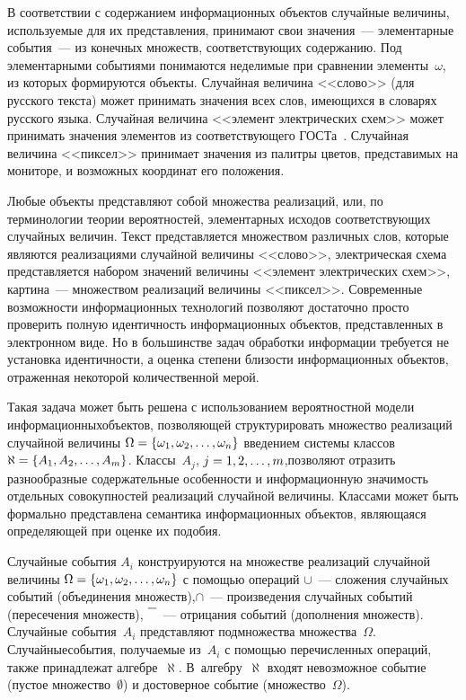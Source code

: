 \begin{multicols}{2}
  В соответствии с содержанием информационных объектов случайные
величины, используемые для их представления, принимают свои значения~---
элементарные события~--- из конечных множеств, соответствующих
содержанию. Под элементарными событиями понимаются неделимые при
сравнении элементы~$\omega$, из которых формируются объекты. Случайная
величина <<слово>> (для русского текста) может принимать значения всех
слов, имеющихся в словарях русского языка. Случайная величина <<элемент
электрических схем>> может принимать значения элементов из
соответствующего ГОСТа~\cite{7-kuz}. Случайная величина <<пиксел>>
принимает значения из палитры цветов, представимых на мониторе, и
возможных координат его положения.

  Любые объекты представляют собой множества реализаций, или, по
терминологии теории вероятностей, элементарных исходов соответствующих
случайных величин. Текст представляется множеством различных слов,
которые являются реализациями случайной величины <<слово>>,
электрическая схема представляется набором значений величины <<элемент
электрических схем>>, картина~--- множеством реализаций величины
<<пиксел>>. Современные возможности информационных технологий
позволяют достаточно просто проверить полную идентичность
информационных объектов, представленных в электронном виде. Но в
большинстве задач обработки информации требуется не установка
идентичности, а оценка степени бли\-зости информационных объектов,
отраженная некоторой количественной мерой.

  Такая задача может быть решена с использова\-нием вероятностной модели
информационных\linebreak объектов, позволяющей структурировать множество
реализаций случайной величины $\Omega\hm= \{\omega_1,\omega_2, \ldots
,\omega_n\}$ введением системы классов $\aleph\hm=\{A_1, A_2, \ldots , A_m\}$.
Классы~$A_j$, $j\hm=1, 2, \ldots , m$,\linebreak позволяют отразить разнообразные
содержательные особенности и информационную значимость отдельных
совокупностей реализаций случайной величины. Классами может быть
формально пред\-став\-ле\-на семантика информационных объектов, являющаяся
определяющей при оценке их подобия.

  Случайные события $A_i$ конструируются на множестве реализаций
случайной величины $\Omega\hm= \{\omega_1,\omega_2, \ldots ,\omega_n\}$ с
помощью операций $\cup$~--- сложения случайных событий (объединения
множеств),\linebreak $\cap$~--- произведения случайных событий (пересечения
множеств), $\overline{\ \  \vphantom{A} }$~--- отрицания событий (дополнения множеств).
Случайные события~$A_i$ представляют подмножества множества~$\Omega$.
Случайные\linebreak события, получаемые из~$A_i$ с помощью перечисленных
операций, также принадлежат алгебре~$\aleph$. В~ал\-геб\-ру~$\aleph$ входят
невозможное событие (пустое множество~$\emptyset$) и достоверное событие
(множество~$\Omega$).


\end{multicols}
